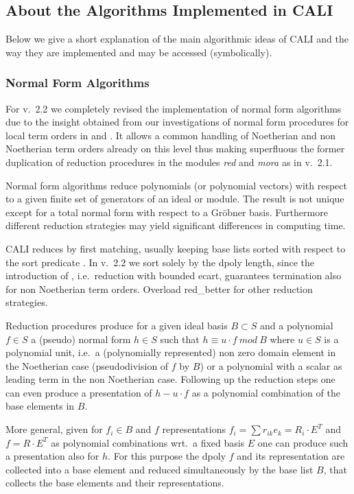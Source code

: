 \subsection{About the Algorithms Implemented in CALI}

Below we give a short explanation of the main algorithmic ideas of
CALI and the way they are implemented and may be accessed
(symbolically).

\subsubsection{Normal Form Algorithms}

For v.\ 2.2 we completely revised the implementation of normal form
algorithms due to the insight obtained from our investigations of
normal form procedures for local term orders in \cite{Graebe:95a} and
\cite{Graebe:94}. It allows a common handling of Noetherian and non
Noetherian term orders already on this level thus making superfluous
the former duplication of reduction procedures in the modules {\em
red} and \emph{mora} as in v.\ 2.1.
\medskip

Normal form algorithms reduce polynomials (or polynomial vectors)
with respect to a given finite set of generators of an ideal or
module. The result is not unique except for a total normal form with
respect to a Gr\"obner basis. Furthermore different reduction strategies
may yield significant differences in computing time.

CALI reduces by first matching, usually keeping base lists sorted
with respect to the sort predicate . In v.\ 2.2 we
sort solely by the dpoly length, since the introduction of
, i.e.\ reduction with bounded ecart, guarantees
termination also for non Noetherian term orders. Overload red\_better
for other reduction strategies.
\medskip

Reduction procedures produce for a given ideal basis $B\subset S$ and
a polynomial $f\in S$ a (pseudo) normal form $h\in S$ such that
$h\equiv u\cdot f\ mod\ B$ where $u\in S$ is a polynomial unit, i.e.\
a (polynomially represented) non zero domain element in the Noetherian
case (pseudodivision of $f$ by $B$) or a polynomial with a scalar as
leading term in the non Noetherian case. Following up the reduction
steps one can even produce a presentation of $h-u\cdot f$ as a
polynomial combination of the base elements in $B$.

More general, given for $f_i\in B$ and $f$ representations $f_i =
\sum{r_{ik}e_k} = R_i\cdot E^T$ and $f=R\cdot E^T$ as polynomial
combinations wrt.\ a fixed basis $E$ one can produce such a
presentation also for $h$. For this purpose the dpoly $f$ and its
representation are collected into a base element and reduced
simultaneously by the base list $B$, that collects the base elements
and their representations.
\medskip

